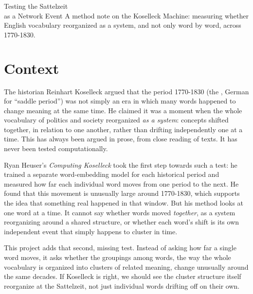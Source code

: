 \documentclass[11pt]{article}
\begin{document}
\specimencover
  {Testing the Sattelzeit\\as a Network Event}
  {A method note on the Koselleck Machine: measuring whether English
   vocabulary reorganized as a system, and not only word by word, across
   1770-1830.}
  {%
  }

\tableofcontents

\newpage

\section{Context}

The historian Reinhart Koselleck argued that the period 1770-1830 (the
, German for ``saddle period'') was not simply an era
in which many words happened to change meaning at the same time. He
claimed it was a moment when the whole vocabulary of politics and society
reorganized \emph{as a system}: concepts shifted together, in
relation to one another, rather than drifting independently one at a
time. This has always been argued in prose, from close reading of texts.
It has never been tested computationally.

Ryan Heuser's \emph{Computing Koselleck} took the first step towards such
a test: he trained a separate word-embedding model for each historical
period and measured how far each individual word moves from one period
to the next. He found that this movement is unusually large around
1770-1830, which supports the idea that something real happened in that
window. But his method looks at one word at a time. It cannot say
whether words moved \emph{together}, as a system reorganizing around a
shared structure, or whether each word's shift is its own independent
event that simply happens to cluster in time.

This project adds that second, missing test. Instead of asking how far a
single word moves, it asks whether the groupings among words, the
way the whole vocabulary is organized into clusters of related meaning,
change unusually around the same decades. If Koselleck is right, we
should see the cluster structure itself reorganize at the Sattelzeit, not
just individual words drifting off on their own.
\end{document}

